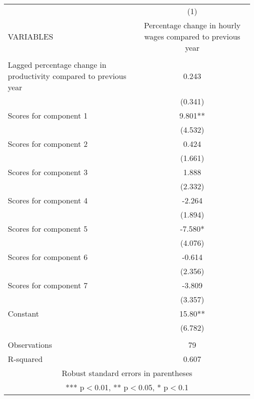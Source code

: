 \documentclass[]{article}
\begin{document}
\begin{tabular}{lc} \hline
 & (1) \\
VARIABLES & Percentage change in hourly wages compared to previous year \\ \hline
 &  \\
Lagged percentage change in productivity compared to previous year & 0.243 \\
 & (0.341) \\
Scores for component 1 & 9.801** \\
 & (4.532) \\
Scores for component 2 & 0.424 \\
 & (1.661) \\
Scores for component 3 & 1.888 \\
 & (2.332) \\
Scores for component 4 & -2.264 \\
 & (1.894) \\
Scores for component 5 & -7.580* \\
 & (4.076) \\
Scores for component 6 & -0.614 \\
 & (2.356) \\
Scores for component 7 & -3.809 \\
 & (3.357) \\
Constant & 15.80** \\
 & (6.782) \\
 &  \\
Observations & 79 \\
 R-squared & 0.607 \\ \hline
\multicolumn{2}{c}{ Robust standard errors in parentheses} \\
\multicolumn{2}{c}{ *** p$<$0.01, ** p$<$0.05, * p$<$0.1} \\
\end{tabular}
\end{document}
